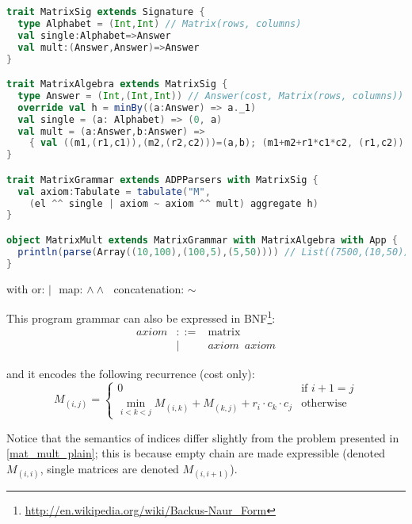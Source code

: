 \newpage
\begin{lstlisting}[language=Scala, caption=Matrix chain mulitiplication DSL implementation]
trait MatrixSig extends Signature {
  type Alphabet = (Int,Int) // Matrix(rows, columns)
  val single:Alphabet=>Answer
  val mult:(Answer,Answer)=>Answer
}

trait MatrixAlgebra extends MatrixSig {
  type Answer = (Int,(Int,Int)) // Answer(cost, Matrix(rows, columns))
  override val h = minBy((a:Answer) => a._1)
  val single = (a: Alphabet) => (0, a)
  val mult = (a:Answer,b:Answer) =>
    { val ((m1,(r1,c1)),(m2,(r2,c2)))=(a,b); (m1+m2+r1*c1*c2, (r1,c2)) }
}

trait MatrixGrammar extends ADPParsers with MatrixSig {
  val axiom:Tabulate = tabulate("M",
    (el ^^ single | axiom ~ axiom ^^ mult) aggregate h)
}

object MatrixMult extends MatrixGrammar with MatrixAlgebra with App {
  println(parse(Array((10,100),(100,5),(5,50)))) // List((7500,(10,50)))
}
\end{lstlisting}
\begin{center}\vspace{-18pt} with or: $|\,\,$ map: $\land\land\,\,$ concatenation: $\sim$ \end{center}

This program grammar can also be expressed in BNF\footnote{\url{http://en.wikipedia.org/wiki/Backus-Naur\_Form}}:
\[\begin{array}{lrl}
axiom &::=& \text{matrix} \\
 &|& axiom \,\,\, axiom
\end{array}\]

and it encodes the following recurrence (cost only):
	\[M_{(i,j)}=\left\{\begin{array}{ll}
		0 & \text{if } i+1= j\\
		\min_{i<k<j} M_{(i,k)}+M_{(k,j)}+r_i \cdot c_k \cdot c_j & \text{otherwise}
	\end{array}\right. \]

Notice that the semantics of indices differ slightly from the problem presented in \ref{mat_mult_plain}; this is because empty chain are made expressible (denoted $M_{(i,i)}$, single matrices are denoted $M_{(i,i+1)}$).

\newpage
